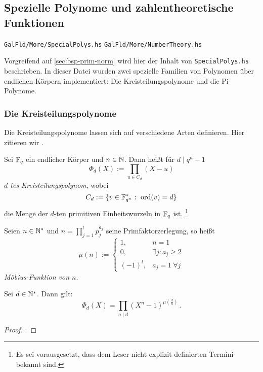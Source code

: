 \subsection{Spezielle Polynome und zahlentheoretische Funktionen}

\texttt{GalFld/More/SpecialPolys.hs}
\texttt{GalFld/More/NumberTheory.hs}

Vorgreifend auf \autoref{sec:bsp-prim-norm} wird hier der Inhalt von 
\texttt{SpecialPolys.hs} beschrieben. In dieser Datei wurden zwei spezielle
Familien von Polynomen über endlichen Körpern implementiert: Die
Kreisteilungspolynome und die Pi-Polynome.

\subsubsection{Die Kreisteilungspolynome}

Die Kreisteilungspolynome lassen sich auf verschiedene Arten definieren. Hier
zitieren wir \cite[Abschnitt 4]{hach2013eki}.

\begin{definition}[Kreisteilungspolynom]
  Sei $\mathbb{F}_q$ ein endlicher Körper und $n\in \mathbb{N}$. Dann heißt für 
  $d\mid q^n-1$
  \[ \Phi_d(X) := \prod_{u \in C_d} (X-u)\]
  \emph{$d$-tes Kreisteilungspolynom}, wobei
  \[ C_d := \{ v\in \mathbb{F}_{q^n}^\ast:\ \operatorname{ord}(v) = d\}\]
  die Menge der $d$-ten primitiven Einheitswurzeln in $\mathbb{F}_q$ ist.%
  \footnote{Es sei vorausgesetzt, dass dem Leser nicht explizit definierten
  Termini bekannt sind.}
\end{definition}

\begin{definition}
  Seien $n \in \mathbb{N}^\ast$ und $n = \prod_{j=1}^l p_j^{a_j}$ seine
  Primfaktorzerlegung, so heißt
  \[ \mu(n) := \begin{cases} 1, &n=1\\ 0,& \exists j: a_j \geq 2\\
    (-1)^l, & a_j=1 \ \forall j \end{cases}\]
  \emph{Möbius-Funktion von $n$}.
\end{definition}

\begin{prop}
  Sei $d\in \mathbb{N}^\ast$. Dann gilt: 
  \[ \Phi_d(X) = \prod_{n\mid d} (X^n-1)^{\mu(\frac{d}{n})} \,.\]
\end{prop}
\begin{proof}
  \autocite[Abschnitt 4]{hach2013eki}.
\end{proof}

